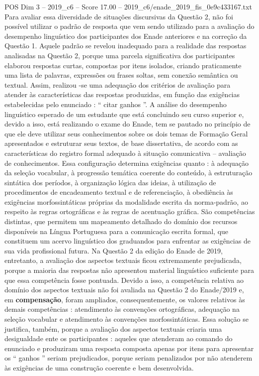 \begin{textsample}{POS Dim 3 – 2019\_c6 – Score 17.00 – 2019\_c6/enade\_2019\_fis\_0e9c433167.txt}
Para avaliar essa diversidade de situações discursivas da Questão 2, não foi possível utilizar o padrão de resposta que vem sendo utilizado para a avaliação do desempenho linguístico dos participantes dos Enade anteriores e na correção da Questão 1.
Aquele padrão se revelou inadequado para a realidade das respostas analisadas na Questão 2, porque uma parcela significativa dos participantes elaborou respostas curtas, compostas por itens isolados, criando praticamente uma lista de palavras, expressões ou frases soltas, sem conexão semântica ou textual.
Assim, realizou -se uma adequação dos critérios de avaliação para atender às características das respostas produzidas, em função das exigências estabelecidas pelo enunciado : “ citar ganhos ”.
A análise do desempenho linguístico esperado de um estudante que está concluindo seu curso superior e, devido a isso, está realizando o exame do Enade, tem se pautado no princípio de que ele deve utilizar seus conhecimentos sobre os dois temas de Formação Geral apresentados e estruturar seus textos, de base dissertativa, de acordo com as características do registro formal adequado à situação comunicativa – avaliação de conhecimentos.
Essa configuração determina exigências quanto : à adequação da seleção vocabular, à progressão temática coerente do conteúdo, à estruturação sintática dos períodos, à organização lógica das ideias, à utilização de procedimentos de encadeamento textual e de referenciação, à obediência às exigências morfossintáticas próprias da modalidade escrita da norma-padrão, ao respeito às regras ortográficas e às regras de acentuação gráfica.
São competências distintas, que permitem um mapeamento detalhado do domínio dos recursos disponíveis na Língua Portuguesa para a comunicação escrita formal, que constituem um acervo linguístico dos graduandos para enfrentar as exigências de sua vida profissional futura.
Na Questão 2 da edição do Enade de 2019, entretanto, a avaliação dos aspectos textuais ficou extremamente prejudicada, porque a maioria das respostas não apresentou material linguístico suficiente para que essa competência fosse pontuada.
Devido a isso, a competência relativa ao domínio dos aspectos textuais não foi avaliada na Questão 2 do Enade/2019 e, em \textbf{compensação}, foram ampliados, consequentemente, os valores relativos às demais competências : atendimento às convenções ortográficas, adequação na seleção vocabular e atendimento às convenções morfossintáticas.
Essa solução se justifica, também, porque a avaliação dos aspectos textuais criaria uma desigualdade ente os participantes : aqueles que atenderam ao comando do enunciado e produziram uma resposta composta apenas por itens para apresentar os “ ganhos ” seriam prejudicados, porque seriam penalizados por não atenderem às exigências de uma construção coerente e bem desenvolvida.

\end{textsample}

